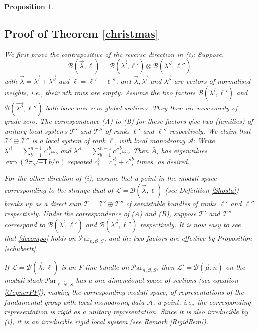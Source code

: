 \documentclass[11pt]{amsart}
\newcommand\mt{\mathcal{T}}
\newcommand\ml{\mathcal{L}}
\newcommand\ma{\mathcal{A}}
\newcommand\Par{\mathcal{P}\text{ar} }
\newtheorem{proposition}[theorem]{Proposition}
\numberwithin{theorem}{subsection}
\begin{document}
{\begin{proposition}
\subsection{Proof of Theorem \ref{christmas}}
We first prove the  contrapositive of  the reverse direction in (i): Suppose,
\begin{equation}\label{decompo}
\mathcal{B}(\vec{\lambda},\ell)=\mathcal{B}(\vec{\lambda'},\ell')\otimes \mathcal{B}(\vec{\lambda''},\ell'')
\end{equation}
with $\vec{\lambda}=\vec{\lambda'}+\vec{\lambda''}$ and $\ell=\ell'+\ell''$, and $\vec{\lambda},\vec{\lambda'}$ and $\vec{\lambda''}$ are vectors of  normalised weights, i.e., their $n$th rows are empty.   Assume the two factors $\mathcal{B}(\vec{\lambda'},\ell')$ and $\mathcal{B}(\vec{\lambda''},\ell'')$ both have non-zero global sections. They then are necessarily of grade zero. The correspondence (A) to (B) for these factors give two (families) of unitary local systems $\mt'$ and $\mt''$ of ranks $\ell'$ and $\ell''$ respectively. We claim that $\mt'\oplus\mt''$ is a local system of rank $\ell$, with local monodromy $\mathcal{A}$: Write $\lambda'^i=\sum_{b=1}^{n-1} c'^b_i\omega_b$ and $\lambda'^i=\sum_{b=1}^{n-1} c''^b_i\omega_b$. Then $\bar{A}_i$ has eigenvalues $\exp(2\pi \sqrt{-1}b/n)$ repeated $c^b_i=c'^b_i+c''^b_i$ times, as desired.

For the other direction of (i), assume that a point in the moduli space corresponding to the strange dual of $\ml=\mathcal{B}(\vec{\lambda},\ell)$ (see Definition \ref{Shosta})  breaks up as a direct sum $\mathcal{T}=\mathcal{T}'\oplus \mathcal{T}''$ of semistable bundles of ranks $\ell'$ and $\ell''$ respectively. Under the correspondence of (A) and (B), suppose $\mt'$ and $\mt''$ correspond to $\mathcal{B}(\vec{\lambda'}, \ell')$  and $\mathcal{B}(\vec{\lambda''}, \ell'')$ respectively. It is now easy to see that
\eqref{decompo} holds on $\Par_{n,\mathcal{O},S}$, and the two factors are effective by Proposition  \ref{schubertt}.


If $\ml=\mathcal{B}(\vec{\lambda},\ell)$ is an F-line bundle on   $\Par_{n,\mathcal{O},S}$, then $\ml'=\mathcal{B}(\vec{\mu},n)$ on the moduli stack  $\Par_{\ell,\widetilde{\mathcal{N}},S}$ has a one dimensional space of sections (see equation \ref{GepnerPP}), making the corresponding moduli space, of representations of the fundamental group with local monodromy data $\ma$, a point, i.e., the corresponding representation is rigid as a unitary representation. Since it is also irreducible by (i), it is an irreducible rigid local system (see Remark \ref{RigidRem}).


\end{proposition}}
\end{document}
